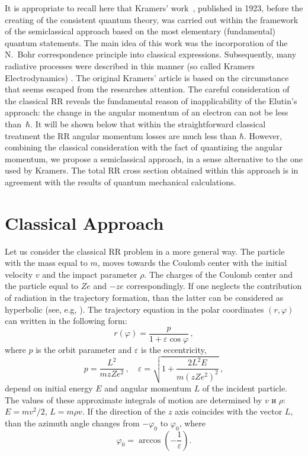 \documentclass{SovJurn/JETPL}
\begin{document}
\par It is appropriate to recall here that Kramers' work~\cite{kramers1923xciii}, published in 1923, before the creating of the consistent quantum theory, was carried out within the framework of the semiclassical approach based on the most elementary (fundamental) quantum statements. The main idea of this work was the incorporation of the N.~Bohr correspondence principle into classical expressions. Subsequently, many radiative processes were described in this manner (so called Kramers Electrodynamics) \cite{kogan1992kramer}. The original Kramers' article is based on the circumstance that seems escaped from the researches attention. The careful consideration of the classical RR reveals the fundamental reason of inapplicability of the Elutin's  \cite{elutin} approach: the change in the angular momentum of an electron can not be less than~$\hbar$. It will be shown below that within the straightforward classical treatment the RR angular momentum losses are much less than $\hbar$.  However, combining the classical consideration with the fact of quantizing the angular momentum, we propose a semiclassical approach, in a sense alternative to the one used by Kramers. The total RR cross section obtained within this approach is in agreement with the results of quantum mechanical calculations.
\section{Classical Approach}
Let us consider the classical RR problem in a more general way. The particle with the mass equal to $m$, moves towards the Coulomb center with the initial velocity $v$ and the impact parameter $\rho$. The charges of the Coulomb center and the particle equal to $Ze$ and $-ze$ correspondingly. If one neglects the contribution of radiation in the trajectory formation, than the latter can be considered as hyperbolic (see, e.g, \cite{landau1988theoretical}). The trajectory equation in the polar coordinates $(r,\varphi)$ can written in the following form:
\begin{equation}
r(\varphi)=\frac{p}{1+\varepsilon\cos{\varphi}}\,,
\label{r_phi}
\end{equation}
where $p$ is the orbit parameter and $\varepsilon$ is the eccentricity,
\begin{equation}
p=\frac{L^2}{mzZe^2}\,,\quad 
\varepsilon=\sqrt{1+\frac{2L^2E}{m(zZe^2)^2}}\,,
\label{parameters}
\end{equation}
depend on initial energy $E$ and angular momentum $L$ of the incident particle. The values of these approximate integrals of motion are determined by $v$ и $\rho$: $E=mv^2/2$, $L=m\rho v$. If the direction of the $z$ axis coincides with the vector $L$, than the 
azimuth angle changes from $-\varphi_0$ to $\varphi_0$, where
\begin{equation}
\varphi_0=\arccos\left(-\frac{1}{\varepsilon}\right).
\label{angle}
\end{equation}
\end{document}
